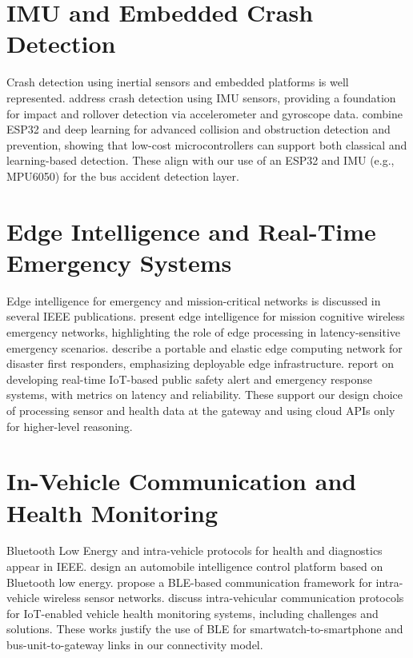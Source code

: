 \documentclass[conference]{IEEEtran}
\begin{document}
\section{IMU and Embedded Crash Detection}

Crash detection using inertial sensors and embedded platforms is well represented. \cite{ieee_crash_imu} address crash detection using IMU sensors, providing a foundation for impact and rollover detection via accelerometer and gyroscope data. \cite{ieee_esp32_deep} combine ESP32 and deep learning for advanced collision and obstruction detection and prevention, showing that low-cost microcontrollers can support both classical and learning-based detection. These align with our use of an ESP32 and IMU (e.g., MPU6050) for the bus accident detection layer.

\section{Edge Intelligence and Real-Time Emergency Systems}

Edge intelligence for emergency and mission-critical networks is discussed in several IEEE publications. \cite{ieee_edge_mission} present edge intelligence for mission cognitive wireless emergency networks, highlighting the role of edge processing in latency-sensitive emergency scenarios. \cite{ieee_portable_edge_disaster} describe a portable and elastic edge computing network for disaster first responders, emphasizing deployable edge infrastructure. \cite{ieee_realtime_iot_safety} report on developing real-time IoT-based public safety alert and emergency response systems, with metrics on latency and reliability. These support our design choice of processing sensor and health data at the gateway and using cloud APIs only for higher-level reasoning.

\section{In-Vehicle Communication and Health Monitoring}

Bluetooth Low Energy and intra-vehicle protocols for health and diagnostics appear in IEEE. \cite{ieee_ble_automobile} design an automobile intelligence control platform based on Bluetooth low energy. \cite{ieee_ble_intra_vehicle} propose a BLE-based communication framework for intra-vehicle wireless sensor networks. \cite{ieee_intra_vehicular_iot} discuss intra-vehicular communication protocols for IoT-enabled vehicle health monitoring systems, including challenges and solutions. These works justify the use of BLE for smartwatch-to-smartphone and bus-unit-to-gateway links in our connectivity model.
\end{document}
